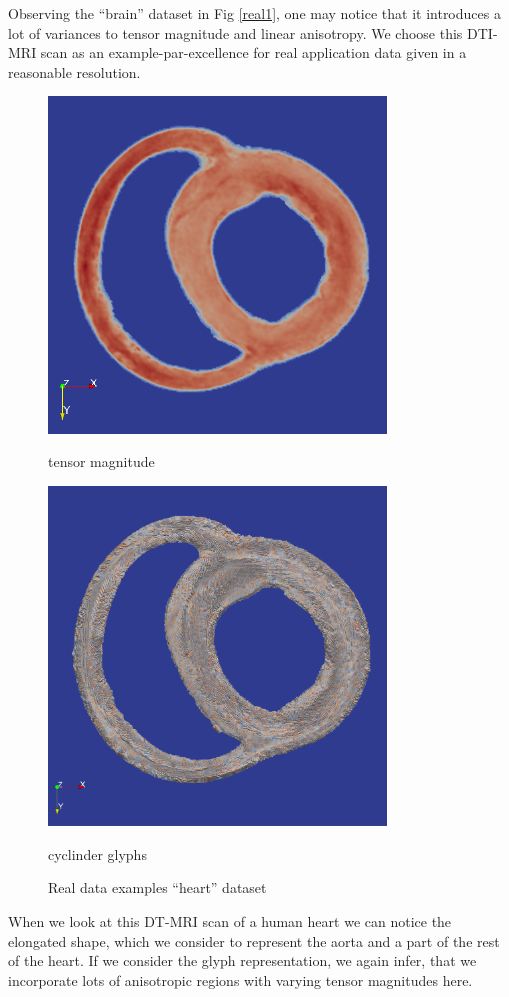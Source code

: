 \documentclass{scrartcl}
\begin{document}
Observing the \enquote{brain} dataset in Fig \ref{real1}, one may notice that it introduces a lot of variances to tensor magnitude and linear anisotropy. We choose this DTI-MRI scan as an example-par-excellence for real application data given in a reasonable resolution.
\begin{figure}[!t]
\centering
  \begin{minipage}{0.4\textwidth}
    \includegraphics[width=0.8\textwidth]{img/heart_org.png}
    \label{a)}
    \caption*{tensor magnitude}
  \end{minipage}
  \begin{minipage}{0.4\textwidth}
      \includegraphics[width=0.8\textwidth]{img/heart_cyl_glyphs.png}
    \label{b)}
    \caption*{cyclinder glyphs}
  \end{minipage}
\caption{Real data examples \enquote{heart} dataset}
\label{real2}
\end{figure}
When we look at this DT-MRI scan of a human heart we can notice the elongated shape, which we consider to represent the aorta and a part of the rest of the heart. If we consider the glyph representation, we again infer, that we incorporate lots of anisotropic regions with varying tensor magnitudes here.
\end{document}
